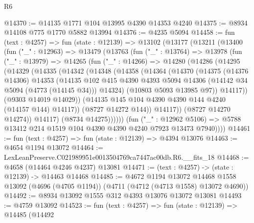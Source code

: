 \begin{lexlean}{R6}
\begin{coremodule}
@14370 := @14135 @1771 @104 @13995 @4390 @14353 @4240
@14375 := @8934 @14108 @775 @1770 @5882 @13994
@14376 := @4235 @5094
@14458 := fun (text : @4257) =>
  fun (state : @12139) =>
  @13102
    (@13177
      (@13211
        (@13400
          (fun ("_" : @12963) =>
          @13479
            (@13763
              (fun ("_" : @13764) =>
              @13978
                (fun ("_" : @13979) =>
                @14265
                  (fun ("_" : @14266) =>
                  @14280
                    (@14286
                      (@14295
                        (@14329
                          (@14335
                            (@14342
                              (@14348
                                (@14358
                                  (@14364
                                    (@14370
                                      (@14375
                                        (@14376 @14306)
                                        @14353
                                        (@14135
                                          @102
                                          @415
                                          @4390
                                          @4393
                                          @5094
                                          @14306
                                          (@14142 @34 @5094 (@4773 (@14145 @34)))
                                          @14324)
                                        (@10803 @5093 @13985 @97))
                                      @14117))
                                  (@9303 @14019 @14029))
                                (@14135 @145 @104 @4390 @4390 @144 @4240 (@14157 @144) @14117))
                              (@8727 @14272 @144))
                            @14117))
                        (@8727 @14270 @14274))
                      @14117)
                    (@8734 @14275))))))
          (fun ("_" : @12962 @5106) =>
          @5788 @13412 @214 @1519 @104 @4390 @4390 @4240 @7923 @13473 @7940))))
@14461 := fun (text : @4257) => fun (state : @12139) => @4394 @13076
@14463 := @4654 @1194 @13072
@14464 := LexLeanPreserve.C021989951e0013504769ca7447ac00db.R6.__fits_18
@14468 := @4658 (@14464 @4246 @4237) @13081
@14471 := (text : @4257) -> (state : @12139) -> @14463 @14468
@14485 := @4672
    @1194
    @13072
    @14468
    @1558
    @13092
    (@4696 (@4705 @1194))
    (@4711 (@4712 (@4713 @1558) @13072 @4690))
@14492 := @8934 @13092 @1555 @312 @4393 @13076 @13072 @13081
@14493 := @4759 @13092
@14523 := fun (text : @4257) =>
  fun (state : @12139) =>
  @14485
    (@14492

\end{coremodule}
\end{lexlean}
